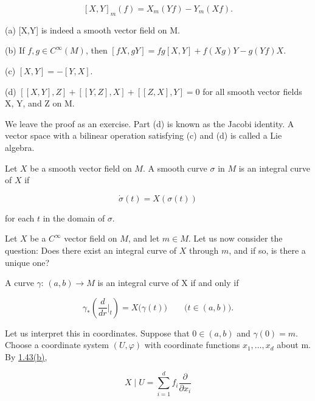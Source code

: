 \begin{equation}
	\tag{1}\label{eq:1.44:1}
	[X,Y]_{m}(f)=X_{m}(Y f)-Y_{m}(X f).
\end{equation}

\begin{proposition}\label{thm:1.45}
	(a) [X,Y] is indeed a smooth vector field on M.

	(b) If $f, g \in C^{\infty}(M)$, then $[fX, gY] = fg[X, Y] + f(Xg)Y - g(Yf)X$.

	(c)  $ [X,Y] = -[Y,X] $.

	(d)  $ [[X,Y],Z] + [[Y,Z],X] + [[Z,X],Y] = 0 $ for all smooth vector fields X, Y, and Z on M.

	We leave the proof as an exercise. Part (d) is known as the Jacobi identity. A vector space with a bilinear operation satisfying (c) and (d) is called a Lie algebra. 

\end{proposition}

\begin{definition}\label{thm:1.46}
	Let $X$ be a smooth vector field on $M$. A smooth curve $\sigma$ in $M$ is an integral curve of $X$ if

	\begin{equation}
		\tag{1}\label{eq:1.46:1}
		\dot{\sigma}(t)=X(\sigma(t))
	\end{equation}

	for each $t$ in the domain of $\sigma$.
\end{definition}

\label{thm:1.47}
Let $X$ be a $C^\infty$ vector field on $M$, and let $m \in M$. Let us now consider the question: Does there exist an integral curve of $X$ through $m$, and if so, is there a unique one?

A curve  $ \gamma $:  $ (a,b) \to M $ is an integral curve of X if and only if

\begin{equation}
	\tag{1}\label{eq:1.47:1}
	\gamma_{*}\left(\frac{d}{d r}\bigg|_{t}\right)=X\big(\gamma(t)\big)\qquad\big(t\in(a,b)\big).
\end{equation}

Let us interpret this in coordinates. Suppose that  $ 0 \in (a,b) $ and  $ \gamma(0) = m $. Choose a coordinate system  $ (U,\varphi) $ with coordinate functions  $ x_1, \ldots, x_d $ about m. By \hyperref[thm:1.43]{1.43(b)},

\begin{equation}
	\tag{2}\label{eq:1.47:2}
	X\mid U=\sum_{i=1}^{d}f_{i}\frac{\partial}{\partial x_{i}}
\end{equation}


